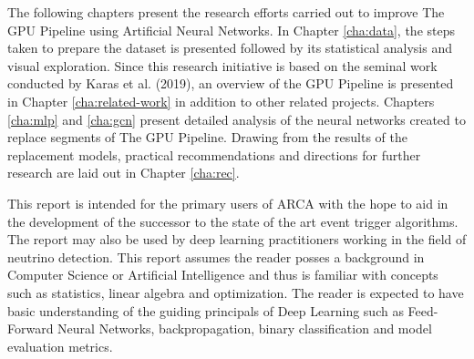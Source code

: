 The following chapters present the research efforts carried out to
improve The GPU Pipeline using Artificial Neural Networks. In Chapter
\ref{cha:data}, the steps taken to prepare the dataset is presented
followed by its statistical analysis and visual exploration. Since
this research initiative is based on the seminal work conducted by
Karas et al. (2019), an overview of the GPU Pipeline is presented in
Chapter \ref{cha:related-work} in addition to other related projects.
Chapters \ref{cha:mlp} and \ref{cha:gcn} present detailed analysis of
the neural networks created to replace segments of The GPU Pipeline.
Drawing from the results of the replacement models, practical
recommendations and directions for further research are laid out in
Chapter \ref{cha:rec}.

This report is intended for the primary users of ARCA with the hope to
aid in the development of the successor to the state of the art event
trigger algorithms. The report may also be used by deep learning
practitioners working in the field of neutrino detection. This report
assumes the reader posses a background in Computer Science or
Artificial Intelligence and thus is familiar with concepts such as
statistics, linear algebra and optimization. The reader is expected to
have basic understanding of the guiding principals of Deep Learning
such as Feed-Forward Neural Networks, backpropagation, binary
classification and model evaluation metrics.

